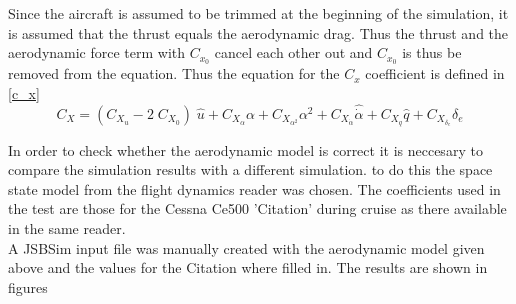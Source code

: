 Since the aircraft is assumed to be trimmed at the beginning of the simulation, it is assumed that the thrust equals the aerodynamic drag. Thus the thrust and the aerodynamic force term with $C_{x_0}$ cancel each other out and $C_{x_0}$ is thus be removed from the equation. Thus the equation for the $C_x$ coefficient is defined in \ref{c_x}\\

\begin{equation}
\label{c_x}
{C_X} = ({C_{{X_u}}} - 2\;{C_{{X_0}}})\;\hat u + {C_{{X_\alpha }}}\alpha  + {C_{{X_{{\alpha ^2}}}}}{\alpha ^2} + C_{{X_{\dot{\alpha}}}}\hat{\dot{\alpha}}  + {C_{{X_q}}}\hat q + {C_{{X_{{\delta _e}}}}}{\delta _e}
\end{equation}

In order to check whether the aerodynamic model is correct it is neccesary to compare the simulation results with a different simulation. to do this the space state model from the flight dynamics reader\cite{fdreader} was chosen. The coefficients used in the test are those for the Cessna Ce500 'Citation' during cruise as there available in the same reader.\\

A JSBSim input file was manually created with the aerodynamic model given above and the values for the Citation where filled in. The results are shown in figures  





























































